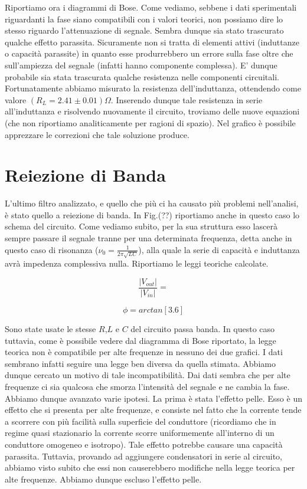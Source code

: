 Riportiamo ora i diagrammi di Bose. Come vediamo, sebbene i dati sperimentali riguardanti la fase siano compatibili con i valori teorici, non possiamo dire lo stesso riguardo l'attenuazione di segnale. Sembra dunque sia stato trascurato qualche effetto parassita. Sicuramente non si tratta di elementi attivi (induttanze o capacità parassite) in quanto esse produrrebbero un errore sulla fase oltre che sull'ampiezza del segnale (infatti hanno componente complessa). E' dunque probabile sia stata trascurata qualche resistenza nelle componenti circuitali. Fortunatamente abbiamo misurato la resistenza dell'induttanza, ottendendo come valore $(R_L=2.41\pm 0.01) \Omega$. Inserendo dunque tale resistenza in serie all'induttanza e risolvendo nuovamente il circuito, troviamo delle nuove equazioni (che non riportiamo analiticamente per ragioni di spazio). Nel grafico è possibile apprezzare le correzioni che tale soluzione produce.



\section{Reiezione di Banda}
L'ultimo filtro analizzato, e quello che più ci ha causato più problemi nell'analisi, è stato quello a reiezione di banda. In Fig.(??) riportiamo anche in questo caso lo schema del circuito. Come vediamo subito, per la sua struttura esso lascerà sempre passare il segnale tranne per una determinata frequenza, detta anche in questo caso di risonanza ($\nu_0=\frac{1}{2 \pi \sqrt{LC}}$), alla quale la serie di capacità e induttanza avrà impedenza complessiva nulla. Riportiamo le leggi teoriche calcolate.

\begin{equation}
\frac{|V_{out}|}{|V_{in}|}=
\end{equation}

\begin{equation}
\phi=arctan[3.6]
\end{equation}

Sono state usate le stesse $R$,$L$ e $C$ del circuito passa banda. In questo caso tuttavia, come è possibile vedere dal diagramma di Bose riportato, la legge teorica non è compatibile per alte frequenze in nessuno dei due grafici. I dati sembrano infatti seguire una legge ben diversa da quella stimata. Abbiamo dunque cercato un motivo di tale incompatibilità. Dai dati sembra che per alte frequenze ci sia qualcosa che smorza l'intensità del segnale e ne cambia la fase. Abbiamo dunque avanzato varie ipotesi.
La prima è stata l'effetto pelle. Esso è un effetto che si presenta per alte frequenze, e consiste nel fatto che la corrente tende a scorrere con più facilità sulla superficie del conduttore (ricordiamo che in regime quasi stazionario la corrente scorre uniformemente all'interno di un conduttore omogeneo e isotropo). Tale effetto potrebbe causare una capacità parassita. Tuttavia, provando ad aggiungere condensatori in serie al circuito, abbiamo visto subito che essi non causerebbero modifiche nella legge teorica per alte frequenze. Abbiamo dunque escluso l'effetto pelle.

